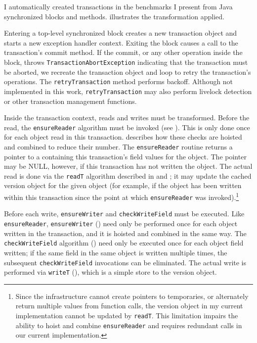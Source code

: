 I automatically created transactions in the benchmarks I present from
Java synchronized blocks and methods.   illustrates
the transformation applied.

Entering a top-level synchronized block creates a new transaction
object and starts a new exception handler context.  Exiting the block
causes a call to the transaction's commit method.  If the commit, or
any other operation inside the block, throws
\texttt{TransactionAbortException} indicating that the transaction
must be aborted, we recreate the transaction object and loop to retry
the transaction's operations.  The \texttt{retryTransaction} method
performs backoff.  Although not implemented in this work,
\texttt{retryTransaction} 
may also perform livelock detection or other
transaction management functions.

Inside the transaction context, reads and writes must be transformed.
Before the read, the \texttt{ensureReader} algorithm
must be invoked (see ).  This
is only done once for each object read in this transaction.
 describes how these checks are hoisted and combined to
reduce their number.  The \texttt{ensureReader} routine returns a
pointer to a  containing this transaction's field
values for the object.  The pointer may be NULL, however, if this
transaction has not written the object.
The actual read is done via the \texttt{readT}
algorithm described in  and ; it may
update the cached version object for the given object (for example, if
the object has been written within this transaction since the point at
which \texttt{ensureReader} was invoked).\footnote{Since the \flex
  infrastructure cannot create pointers to temporaries, or
  alternately return multiple values from function calls, the
  version object in my current implementation cannot be updated by
  \texttt{readT}.  This limitation impairs the ability to hoist and combine
  \texttt{ensureReader} and requires redundant calls in our current
  implementation.}

Before each write, \texttt{ensureWriter} and \texttt{checkWriteField}
must be executed.  Like \texttt{ensureReader}, \texttt{ensureWriter}
() need only be performed once for each object
written in the transaction, and it is hoisted and combined in the same
way.  
The \texttt{checkWriteField} algorithm () need
only be executed once for each object field written; if the same field
in the same object is written multiple times, the subsequent
\texttt{checkWriteField} invocations can be eliminated.  The actual
write is performed via \texttt{writeT} (), which is a
simple store to the version object.

